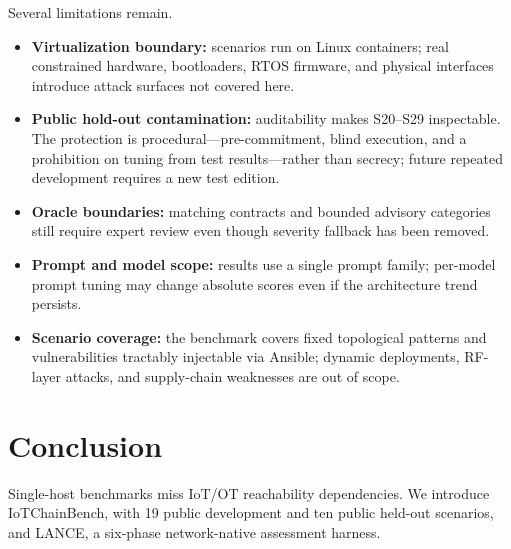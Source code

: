 \documentclass[conference,compsoc]{IEEEtran}
\newcommand{\systemname}{IoTChainBench\xspace}
\newcommand{\harnessname}{\textsc{LANCE}\xspace}
\begin{document}
Several limitations remain.
\begin{itemize}[leftmargin=*,nosep]
  \item \textbf{Virtualization boundary:} scenarios run on Linux containers; real constrained hardware, bootloaders, RTOS firmware, and physical interfaces introduce attack surfaces not covered here.
  \item \textbf{Public hold-out contamination:} auditability makes S20--S29 inspectable. The protection is procedural---pre-commitment, blind execution, and a prohibition on tuning from test results---rather than secrecy; future repeated development requires a new test edition.
  \item \textbf{Oracle boundaries:} matching contracts and bounded advisory categories still require expert review even though severity fallback has been removed.
  \item \textbf{Prompt and model scope:} results use a single prompt family; per-model prompt tuning may change absolute scores even if the architecture trend persists.
  \item \textbf{Scenario coverage:} the benchmark covers fixed topological patterns and vulnerabilities tractably injectable via Ansible; dynamic deployments, RF-layer attacks, and supply-chain weaknesses are out of scope.
\end{itemize}

\section{Conclusion}
\label{sec:conclusion}

Single-host benchmarks miss IoT/OT reachability dependencies. We introduce \systemname{}, with 19 public development and ten public held-out scenarios, and \harnessname{}, a six-phase network-native assessment harness.
\end{document}
